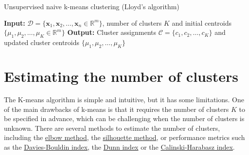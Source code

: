\documentclass{article}[11pt]
\newcommand{\norm}[1]{\left|\left|#1\right|\right|}
\DeclareMathOperator*{\argmin}{arg\,min}
\begin{document}
\begin{algorithm}[H]
   \begin{algorithmic}
   \caption{Unsupervised naive k-means clustering (Lloyd's algorithm)}\label{alg:kmeans}
   \State \textbf{Input:} $\mathcal{D} = \{\mathbf{x}_1, \mathbf{x}_2, \ldots, \mathbf{x}_n\in\mathbb{R}^{m}\}$, number of clusters $K$ and initial centroids $\{\mu_1, \mu_2, \ldots, \mu_K\in\mathbb{R}^{m}\}$
   \State \textbf{Output:} Cluster assignments $\mathcal{C} = \{c_1, c_2, \ldots, c_K\}$ and updated cluster centroids $\{\mu_1, \mu_2, \ldots, \mu_K\}$
      \State{$c_{i}\gets\argmin_{j} \norm{\mathbf{x} - \mu_j}^2$}
   \EndFor 
   \Statex
   \State{$\hat{\mu}\gets\mu$}
   \EndFor
   \Statex
   \If{$\norm{\mu - \hat{\mu}} < \epsilon$}
   \EndIf
   \EndWhile
   \end{algorithmic}
\end{algorithm}

\section{Estimating the number of clusters}
The K-means algorithm is simple and intuitive, but it has some limitations.
One of the main drawbacks of k-means is that it requires the number of clusters $K$ to be specified in advance, which can be challenging when the number of clusters is unknown.
There are several methods to estimate the number of clusters, including the \href{https://en.wikipedia.org/wiki/Elbow_method_(clustering)}{elbow method}, 
the \href{https://en.wikipedia.org/wiki/Silhouette_(clustering)}{silhouette method}, or performance metrics 
such as the \href{https://en.wikipedia.org/wiki/Davies%E2%80%93Bouldin_index}{Davies-Bouldin index}, the \href{https://en.wikipedia.org/wiki/Dunn_index}{Dunn index}
or the \href{https://en.wikipedia.org/wiki/Calinski%E2%80%93Harabasz_index}{Calinski-Harabasz index}.
\end{document}

